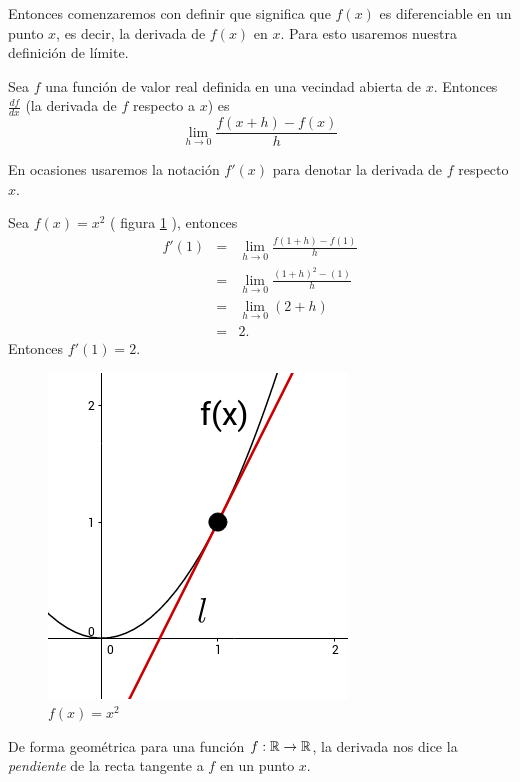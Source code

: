 Entonces comenzaremos con definir que significa que $f(x)$ es diferenciable en un punto $x$, es decir, la derivada de $f(x)$ en $x$. Para esto usaremos
nuestra definición de límite.

\begin{definition}
    Sea $f$ una función de valor real definida en una vecindad abierta de $x$. Entonces $\frac{df}{dx}$ (la derivada de $f$ respecto a $x$) es
    $$ \lim_{h \rightarrow 0} \frac{f(x+h) - f(x)}{h} $$
\end{definition}

En ocasiones usaremos la notación $f'(x)$ para denotar la derivada de $f$ respecto $x$.

\begin{example}
    Sea $f(x)=x^{2}$ ( figura \ref{fig:derivative} ), entonces
    \begin{eqnarray*}
        f'(1) &=& \lim_{h \rightarrow 0} \frac{f(1+h)-f(1)}{h} \\
              &=& \lim_{h \rightarrow 0} \frac{(1+h)^{2}-(1)}{h} \\
              &=& \lim_{h \rightarrow 0} (2 + h) \\
              &=& 2 \text{.}
    \end{eqnarray*}
    Entonces $f'(1) = 2$.
\end{example}

\begin{figure}[!ht]
  \begin{center}
      \includegraphics[width=0.5\linewidth]{gfx/derivative-example}
      \caption{$f(x)=x^{2}$}
      \label{fig:derivative}
  \end{center}
\end{figure}

De forma geométrica para una funci\'on $f:\mathbb{R} \rightarrow \mathbb{R}$, la derivada nos dice la \emph{pendiente} de la recta tangente a $f$ en un punto $x$.


